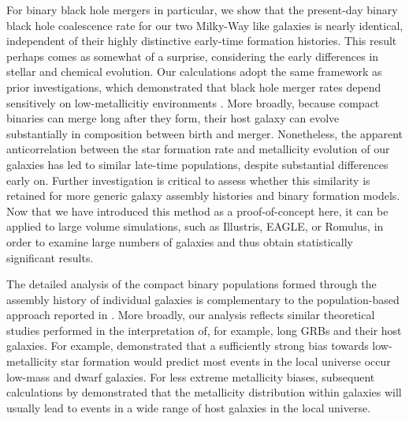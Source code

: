 \documentclass[a4paper,fleqn,usenatbib]{mnras}
\newcommand\jillianremark[1]{{\color{blue}#1}}
\begin{document}
For binary black hole mergers in particular, we show that the present-day binary black hole coalescence rate for our two
Milky-Way like galaxies is nearly identical, independent of their highly distinctive early-time formation histories.   
This result perhaps comes as somewhat of a surprise, considering the early differences in stellar and chemical evolution.
Our calculations adopt the same framework as  prior investigations, which demonstrated 
that black hole merger rates depend sensitively on low-metallicitiy environments
\citep[see,e.g.][]{PSellipticals,popsyn-LowMetallicityImpact2b-StarTrackRevised-2013,gwastro-EventPopsynPaper-2016}.   More broadly,
because compact binaries can merge long after they form, their host galaxy can evolve substantially in composition
between birth and merger.
Nonetheless, the apparent anticorrelation between the star formation rate and metallicity evolution of our galaxies has
led to similar late-time populations, despite substantial differences early on.
%
Further investigation is critical to assess whether this similarity is retained for more generic galaxy assembly
histories and binary formation models.    Now that we have introduced this method as a proof-of-concept here, it can be applied to large volume simulations, such as Illustris, EAGLE, or Romulus, in order to examine large numbers of galaxies and thus obtain statistically significant results.

The detailed analysis of the compact binary populations formed through the assembly history of individual galaxies is
complementary to the  population-based approach reported in
\cite{2016arXiv160508783L}.     More broadly, our analysis reflects  similar theoretical studies performed in the interpretation of, for
example, long GRBs and their host galaxies. 
For example, \cite{2009ApJ...702..377K} demonstrated that a sufficiently strong bias towards low-metallicity star formation would predict
most  events in the local universe occur low-mass and dwarf galaxies.
For less extreme metallicity biases, subsequent calculations by  \citet{2011MNRAS.417..567N} demonstrated that the
metallicity distribution within galaxies will usually lead to events in a wide range of host galaxies in the local universe.
\end{document}
